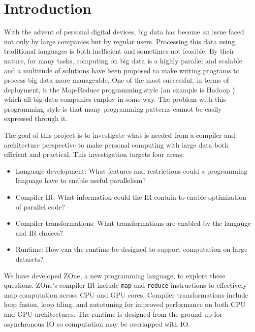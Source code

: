 \section*{Introduction}

With the advent of personal digital devices, big data has become an
issue faced not only by large companies but by regular users. Processing
this data using traditional languages is both inefficient and sometimes
not feasible. By their nature, for many tasks, computing on big data is
a highly parallel and scalable and a multitude of solutions have been
proposed to make writing programs to process big data more manageable.
One of the most successful, in terms of deployment, is the
Map-Reduce\cite{MapReduce} programming style (an example is Hadoop
\cite{Hadoop}) which
all big-data companies employ in some way. The problem with this
programming style is that many programming patterns cannot be easily
expressed through it.

The goal of this project is to investigate what is needed from a compiler and
architecture perspective to make personal computing with large data both
efficient and practical. This investigation targets four areas:
\begin{itemize}
\item Language development: What features and restrictions could a
      programming language have to enable useful parallelism?
\item Compiler IR: What information could the IR contain to enable
      optimization of parallel code?
\item Compiler transformations: What transformations are enabled by
      the langauge and IR choices?
\item Runtime: How can the runtime be designed to support computation
      on large datasets?
\end{itemize}

We have developed ZOne, a new programming language, to explore
these questions. ZOne's compiler IR include \texttt{map} and 
\texttt{reduce} instructions to effectively map computation across
CPU and GPU cores. Compiler transformations include loop fusion,
loop tiling, and autotuning for improved performance on both CPU
and GPU architectures. The runtime is designed from the ground up
for asynchronous IO so computation may be overlapped with IO.

